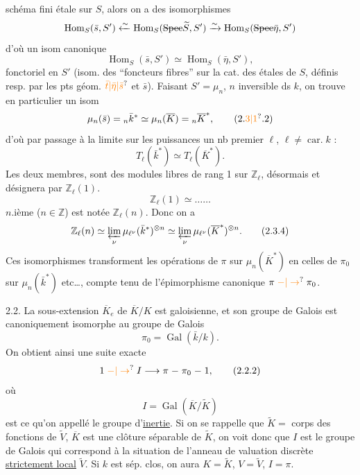 schéma fini étale sur \(S\), alors on a des isomorphismes
\[
\operatorname{Hom}_{S}(\bar s,S')\xleftarrow{\sim}\operatorname{Hom}_S(\deleted{\operatorname{Spec}}\widetilde S,S')\xrightarrow{\sim}\operatorname{Hom}_S(\deleted{\operatorname{Spec}}\bar\eta,S')
\]
d'où un isom canonique
\[
\operatorname{Hom}_S(\bar s,S')\simeq\operatorname{Hom}_S(\bar\eta,S'),\tag*{(2.3.1)}
\]
fonctoriel en \(S'\) (isom. des  ``foncteurs fibres'' sur la cat. des  étales de \(S\), définis resp. par les pts géom. \(\unsure{\bar t|\bar\eta|\bar s}\) et \(\bar s\)). Faisant \(S'=\mu_n\), \(n\)  inversible ds \(k\), on trouve en particulier un isom
\[
\mu_n(\bar s)={}_n\bar k^*\simeq\mu_n(\overline K)={}_n\overline K^*,\tag*{(2.\unsure{3|1}.2)}
\]
d'où par passage à la limite sur les puissances un nb premier \(\ell\), \(\ell\ne\operatorname{car.}k\) :
\[
T_\ell(\bar k^*)\simeq T_\ell(\overline K^*).\tag*{(2.3.3)}
\]
 Les deux membres,  sont des modules libres de rang 1 sur \(\mathbb Z_\ell\),   désormais et désignera par \(\mathbb Z_\ell(1)\). 
\[
\mathbb Z_\ell(1)\simeq\ldots\ldots\tag*{(2.3.3)}
\]
  \(n\).ième (\(n\in\mathbb Z\)) est notée \(\mathbb Z_\ell(n)\). Donc on a
\[
\mathbb Z_\ell(n)\simeq\varprojlim_\nu\mu_{\ell^\nu}(\bar k^*)^{\otimes n}\simeq\varprojlim_\nu\mu_{\ell^\nu}(\overline K^*)^{\otimes n}.\tag*{(2.3.4)}
\]
Ces isomorphismes  transforment les opérations de \(\pi\) sur \(\mu_n(\overline K^*)\)  en celles de \(\pi_0\) sur \(\mu_n(\bar k^*)\) etc\ldots, compte tenu de l'épimorphisme canonique \(\pi\mathrel{\unsure{-|\to}}\pi_0\).

2.2. La sous-extension \(\overline K_e\) de \(\overline K/K\) est galoisienne, et son groupe de Galois est canoniquement isomorphe au groupe de Galois
\[
\pi_0=\operatorname{Gal}(\bar k/k).\tag*{(2.2.1)}
\]
On obtient ainsi une suite exacte
\[
1\mathrel{\unsure{-|\to}} I\longrightarrow\pi\mathrel{-}\pi_0\mathrel{-}1,\tag*{(2.2.2)}
\]
où
\[
I=\operatorname{Gal}(\overline K/\widetilde K)
\]
est ce qu'on appellé le groupe d'\uline{inertie}.   Si on se rappelle que \(\widetilde K=\) corps des fonctions de \(\widetilde V\),  \(\overline K\) est une clôture séparable de \(\widetilde K\), on voit donc que \(I\) est le groupe de Galois qui correspond à la situation  de l'anneau de valuation discrète \uline{strictement local} \(\widetilde V\). Si \(k\) est sép. clos, on aura \(K=\widetilde K\), \(V=\widetilde V\), \(I=\pi\).

